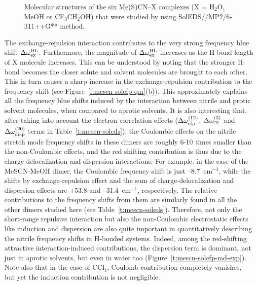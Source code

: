 \documentclass[a4paper,titlepage,twoside,fleqn,12pt]{book}
\begin{document}
\begin{refsection}
\begin{figure}[t!]
{Molecular structures of the six Me(S)CN--X complexes (X = H$_2$O, MeOH or CF$_3$CH$_2$OH)
that were studied by using SolEDS//MP2/6-311++G** method.
\label{f:mescn-soleds}}
\end{figure}
%
The exchange\hyp{}repulsion
interaction contributes to the very strong frequency
blue shift $\Delta\omega^{\rm HL}_{\rm ex}$. Furthermore, the magnitude of
$\Delta\omega^{\rm HL}_{\rm ex}$
increases as the H-bond length of X molecule increases.
This can be understood by noting that the stronger H-bond
becomes the closer solute and solvent molecules are brought
to each other. This in turn causes a sharp increase in the
exchange\hyp{}repulsion contribution to the frequency shift (see
Figure~\ref{f:mescn-solefp-qm}(b)). This approximately explains all the
frequency blue shifts induced by the interaction between
nitrile and protic solvent molecules, when compared to aprotic
solvents. It is also interesting that, after taking into account
the electron correlation effects
($\Delta\omega^{(12)}_{\rm el,r}$,
$\Delta\omega^{(2)}_{\rm ex}$
and $\Delta\omega^{(20)}_{\rm disp}$ terms in Table~\ref{t:mescn-soleds}), 
the Coulombic effects on the nitrile stretch mode
frequency shifts in these dimers are roughly 6-10 times smaller
than the non\hyp{}Coulombic effects, and the red shifting
contribution is thus due to the charge delocalization and
dispersion interactions. For example, in the case of the
MeSCN-MeOH dimer, the Coulombic frequency shift is just
--8.7~cm$^{-1}$, while the shifts by exchange\hyp{}repulsion effect and
the sum of charge\hyp{}delocalization and dispersion effects are
+53.8 and --31.4~cm$^{-1}$, respectively. The relative contributions
to the frequency shifts from them are similarly found in all the
other dimers studied here (see Table~\ref{t:mescn-soleds}). Therefore, not only
the short\hyp{}range repulsive interaction but also the 
non\hyp{}Coulombic electrostatic effects like induction and dispersion
are also quite important in quantitatively describing the nitrile
frequency shifts in H-bonded systems. Indeed, among the red-shifting
attractive interaction\hyp{}induced contributions, the
dispersion term is dominant, not just in aprotic solvents, but
even in water too (Figure~\ref{t:mescn-solefp-md-exp}). 
Note also that in the case of CCl$_4$,
Coulomb contribution completely vanishes, but yet the
induction contribution is not negligible.


\end{refsection}
\end{document}
